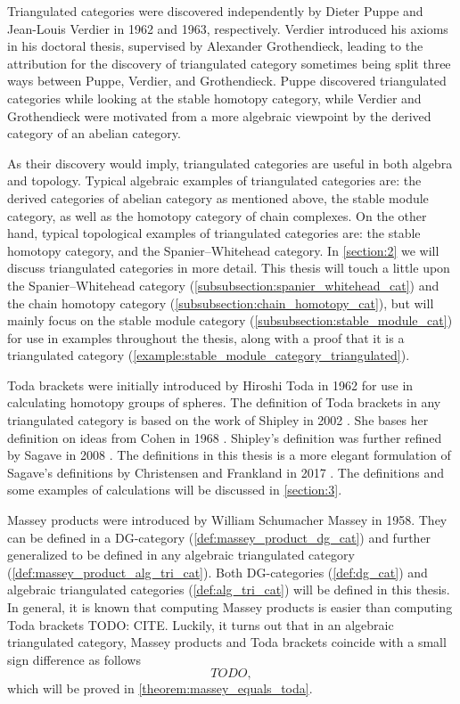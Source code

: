 Triangulated categories were discovered independently by Dieter Puppe and Jean-Louis Verdier in 1962 and 1963, respectively. Verdier introduced his axioms in his doctoral thesis, supervised by Alexander Grothendieck, leading to the attribution for the discovery of triangulated category sometimes being split three ways between Puppe, Verdier, and Grothendieck. Puppe discovered triangulated categories while looking at the stable homotopy category, while Verdier and Grothendieck were motivated from a more algebraic viewpoint by the derived category of an abelian category.

As their discovery would imply, triangulated categories are useful in both algebra and topology. Typical algebraic examples of triangulated categories are: the derived categories of abelian category as mentioned above, the stable module category, as well as the homotopy category of chain complexes. On the other hand, typical topological examples of triangulated categories are: the stable homotopy category, and the Spanier--Whitehead category. In \autoref{section:2} we will discuss triangulated categories in more detail. This thesis will touch a little upon the Spanier--Whitehead category (\autoref{subsubsection:spanier_whitehead_cat}) and the chain homotopy category (\autoref{subsubsection:chain_homotopy_cat}), but will mainly focus on the stable module category (\autoref{subsubsection:stable_module_cat}) for use in examples throughout the thesis, along with a proof that it is a triangulated category (\autoref{example:stable_module_category_triangulated}).

Toda brackets were initially introduced by Hiroshi Toda in 1962 for use in calculating homotopy groups of spheres. The definition of Toda brackets in any triangulated category is based on the work of Shipley in 2002 \cite[Definition A.2]{Shipley_2002}. She bases her definition on ideas from Cohen in 1968 \cite[Definition at the bottom of p. 308]{Cohen_1968}. Shipley's definition was further refined by Sagave in 2008 \cite[Remark 4.5]{Sagave_2008}. The definitions in this thesis is a more elegant formulation of Sagave's definitions by Christensen and Frankland in 2017 \cite[Definition 3.1]{Christensen-Frankland_2017}. The definitions and some examples of calculations will be discussed in \autoref{section:3}.

Massey products were introduced by William Schumacher Massey in 1958. They can be defined in a DG-category (\autoref{def:massey_product_dg_cat}) and further generalized to be defined in any algebraic triangulated category (\autoref{def:massey_product_alg_tri_cat}). Both DG-categories (\autoref{def:dg_cat}) and algebraic triangulated categories (\autoref{def:alg_tri_cat}) will be defined in this thesis. In general, it is known that computing Massey products is easier than computing Toda brackets TODO: CITE. Luckily, it turns out that in an algebraic triangulated category, Massey products and Toda brackets coincide with a small sign difference as follows
\[
    TODO,
\]
which will be proved in \autoref{theorem:massey_equals_toda}.

